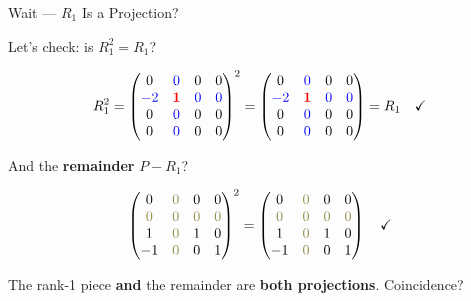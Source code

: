 \documentclass[10pt]{beamer}
\theoremstyle{definition}
\newcommand{\x}[1]{\alert{\textbf{#1}}}
\newcommand{\pvt}[1]{{\color{red}\mathbf{#1}}}       %
\newcommand{\crs}[1]{{\color{blue}#1}}                %
\newcommand{\ghost}[1]{{\color{yellow!50!black}#1}}   %
\begin{document}
\begin{frame}{Wait --- $R_1$ Is a Projection?}

Let's check: is $R_1^2 = R_1$?

$$R_1^2 = \begin{pmatrix} 0 & \crs{0} & 0 & 0 \\ \crs{-2} & \pvt{1} & \crs{0} & \crs{0} \\ 0 & \crs{0} & 0 & 0 \\ 0 & \crs{0} & 0 & 0 \end{pmatrix}^2 = \begin{pmatrix} 0 & \crs{0} & 0 & 0 \\ \crs{-2} & \pvt{1} & \crs{0} & \crs{0} \\ 0 & \crs{0} & 0 & 0 \\ 0 & \crs{0} & 0 & 0 \end{pmatrix} = R_1 \quad \checkmark$$

\vspace{0.3em}

And the \x{remainder} $P - R_1$?

$$\begin{pmatrix} 0 & \ghost{0} & 0 & 0 \\ \ghost{0} & \ghost{0} & \ghost{0} & \ghost{0} \\ 1 & \ghost{0} & 1 & 0 \\ -1 & \ghost{0} & 0 & 1 \end{pmatrix}^2 = \begin{pmatrix} 0 & \ghost{0} & 0 & 0 \\ \ghost{0} & \ghost{0} & \ghost{0} & \ghost{0} \\ 1 & \ghost{0} & 1 & 0 \\ -1 & \ghost{0} & 0 & 1 \end{pmatrix} \quad \checkmark$$

\vspace{0.3em}

The rank-1 piece \x{and} the remainder are \x{both projections}. Coincidence?

\end{frame}
\end{document}
